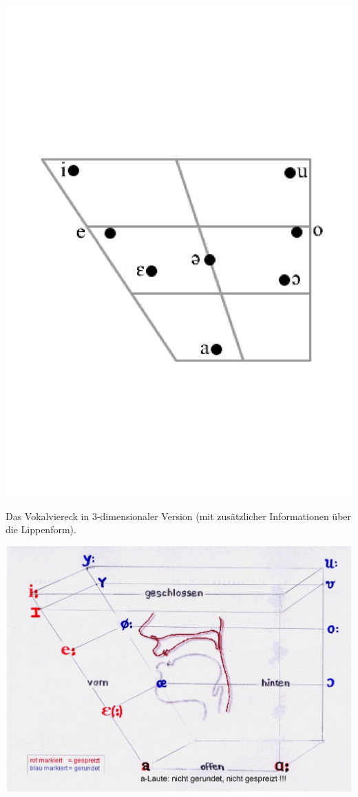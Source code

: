 \documentclass[
  letterpaper,
]{scrbook}
\begin{document}
\includegraphics[width=1\textwidth,height=\textheight]{./pictures/02e_Vokaldreieck_Slowenisch_Vowel_chart_Slovenian_page-0001.jpg}

Das Vokalviereck in 3-dimensionaler Version (mit zusätzlicher
Informationen über die Lippenform).

\includegraphics[width=1\textwidth,height=\textheight]{./pictures/02e_Vokale_3D_Deutsch_page-0001.jpg}
\end{document}
